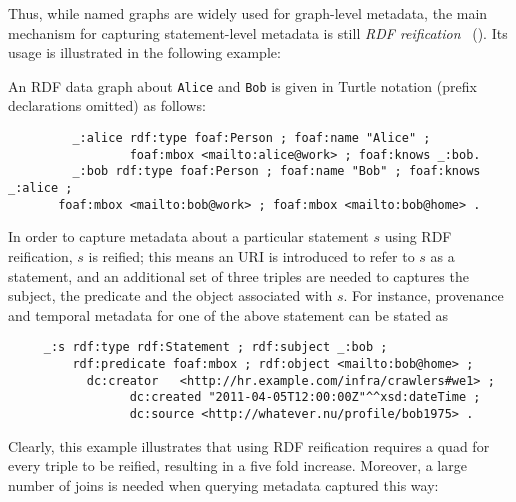 Thus, while named graphs are widely used for graph-level metadata, the main mechanism for capturing statement-level metadata is still \emph{RDF reification}~\cite{Klyne04:RDFconcepts,Hayes04:RDFsemantics} (\emph{\Reifi}). Its usage is illustrated in the following example:

\begin{example}
An RDF data graph about \verb+Alice+ and \verb+Bob+ is given in Turtle notation (prefix declarations omitted) as follows:

	\begin{footnotesize}%
	\begin{verbatim}
		 _:alice rdf:type foaf:Person ; foaf:name "Alice" ; 
		         foaf:mbox <mailto:alice@work> ; foaf:knows _:bob.
		 _:bob rdf:type foaf:Person ; foaf:name "Bob" ; foaf:knows _:alice ;
       foaf:mbox <mailto:bob@work> ; foaf:mbox <mailto:bob@home> .
	\end{verbatim}%
	\end{footnotesize}
In order to capture metadata about a particular statement $s$ using RDF reification, $s$ is reified; this means an URI is introduced to refer to $s$ as a statement, and an additional set of three triples are needed to captures the subject, the predicate and the object associated with $s$. For instance, provenance and temporal metadata for one of the above statement can be stated as 
  \begin{footnotesize}%
	\begin{verbatim}
	 _:s rdf:type rdf:Statement ; rdf:subject _:bob ; 
	     rdf:predicate foaf:mbox ; rdf:object <mailto:bob@home> ; 
	 	   dc:creator	<http://hr.example.com/infra/crawlers#we1> ;
			     dc:created "2011-04-05T12:00:00Z"^^xsd:dateTime ; 
			     dc:source <http://whatever.nu/profile/bob1975> .
	\end{verbatim}%
	\end{footnotesize}
\end{example}


Clearly, this example illustrates that using RDF reification requires a
quad for every triple to be reified, resulting in a five fold increase. Moreover, a large number of joins is needed when querying metadata captured this way:   


